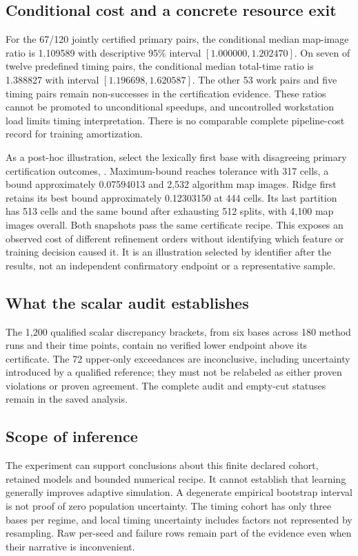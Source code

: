 \documentclass[10pt,a4paper]{article}
\newcommand{\code}[1]{\texttt{\small\detokenize{#1}}}
\begin{document}
\subsection{Conditional cost and a concrete resource exit}
For the 67/120 jointly certified primary pairs, the conditional median
map-image ratio is 1.109589 with descriptive 95\% interval
$[1.000000,1.202470]$. On seven of twelve predefined timing pairs, the
conditional median total-time ratio is 1.388827 with interval
$[1.196698,1.620587]$. The other 53 work pairs and five timing pairs remain
non-successes in the certification evidence. These ratios cannot be promoted
to unconditional speedups, and uncontrolled workstation load limits timing
interpretation. There is no comparable complete pipeline-cost record for
training amortization.

As a post-hoc illustration, select the lexically first base with disagreeing
primary certification outcomes, \code{test-id-2d-000}. Maximum-bound reaches
tolerance with 317 cells, a bound approximately 0.07594013 and 2,532 algorithm
map images. Ridge first retains its best bound approximately 0.12303150 at
444 cells. Its last partition has 513 cells and the same bound after
exhausting 512 splits, with 4,100 map images overall. Both snapshots pass the
same certificate recipe. This exposes an observed cost of different
refinement orders without identifying which feature or training decision
caused it. It is an illustration selected by identifier after the results,
not an independent confirmatory endpoint or a representative sample.

\subsection{What the scalar audit establishes}
The 1,200 qualified scalar discrepancy brackets, from six bases across
180 method runs and their time points, contain no verified lower
endpoint above its certificate. The 72 upper-only exceedances are
inconclusive, including uncertainty introduced by a qualified reference;
they must not be relabeled as either proven violations or proven agreement.
The complete audit and empty-cut statuses remain in the saved analysis.

\subsection{Scope of inference}
The experiment can support conclusions about this finite declared cohort,
retained models and bounded numerical recipe. It cannot establish that learning
generally improves adaptive simulation. A degenerate empirical bootstrap
interval is not proof of zero population uncertainty. The timing cohort has
only three bases per regime, and local timing uncertainty includes factors
not represented by resampling. Raw per-seed and failure rows remain part of
the evidence even when their narrative is inconvenient.
\end{document}

